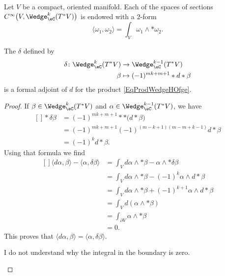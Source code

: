Let $V$ be a compact, oriented manifold. Each of the spaces of sections $ C^{\infty}\big( V, \Wedge^k_{\eC}(T^*V)\big)$ is endowed with a $2$-form
\begin{equation}		\label{EqProdWedgeHOfge}
	\langle \omega_1, \omega_2\rangle =\int_V\omega_1\wedge *\omega_2.
\end{equation}

\begin{lemma}
	The  $\delta$ defined by
	\begin{equation}
		\begin{aligned}[]
			\delta	\colon \Wedge^k_{\eC}(T^*V)&\to \Wedge_{\eC}^{k-1}(T^*V)\\
			\beta				&\mapsto (-1)^{mk+m+1}*d*\beta
		\end{aligned}
	\end{equation}
	is a formal adjoint of $d$ for the product \eqref{EqProdWedgeHOfge}.
\end{lemma}

\begin{proof}
	If $\beta\in\Wedge_{\eC}^k(T^*V)$ and $\alpha\in\Wedge_{\eC}^{k-1}(T^*V)$, we have
	\begin{equation}
		\begin{aligned}[]
			*\delta\beta&=(-1)^{mk+m+1}* *\big( d*\beta \big)\\
			&=(-1)^{mk+m+1}(-1)^{(m-k+1)(m-m+k-1)}d*\beta\\
			&=(-1)^kd*\beta.
		\end{aligned}
	\end{equation}
	Using that formula we find
	\begin{equation}
		\begin{aligned}[]
			\langle d\alpha, \beta\rangle -\langle \alpha, \delta\beta\rangle &=\int_V d\alpha\wedge *\beta-\alpha\wedge *\delta\beta\\
			&=\int_Vd\alpha\wedge *\beta-(-1)^k\alpha\wedge d*\beta\\
			&=\int_Vd\alpha\wedge *\beta+(-1)^{k+1}\alpha\wedge d*\beta\\
			&=\int_Vd(\alpha\wedge *\beta)\\
			&=\int_{\partial V}\alpha\wedge *\beta\\
			&=0.
		\end{aligned}
	\end{equation}
	This proves that $\langle d\alpha, \beta\rangle =\langle \alpha, \delta\beta\rangle$.
	\begin{probleme}
		I do not understand why the integral in the boundary is zero. 
	\end{probleme}	
\end{proof}

